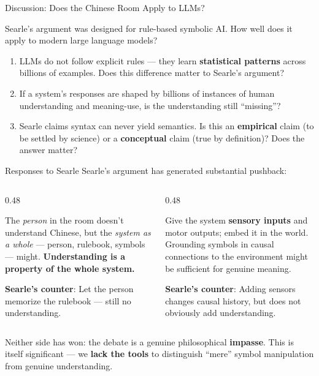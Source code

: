 \documentclass[aspectratio=169,11pt]{beamer}
\begin{document}
\begin{frame}{Discussion: Does the Chinese Room Apply to LLMs?}
\begin{discussionbox}[Discussion]
\small
Searle's argument was designed for rule-based symbolic AI. How well does it apply to modern large language models?
\begin{enumerate}
    \item LLMs do not follow explicit rules --- they learn \textbf{statistical patterns} across billions of examples. Does this difference matter to Searle's argument?
    \item If a system's responses are shaped by billions of instances of human understanding and meaning-use, is the understanding still ``missing''?
    \item Searle claims syntax can never yield semantics. Is this an \textbf{empirical} claim (to be settled by science) or a \textbf{conceptual} claim (true by definition)? Does the answer matter?
\end{enumerate}
\end{discussionbox}
\end{frame}

\begin{frame}[shrink=5]{Responses to Searle}
Searle's argument has generated substantial pushback:

\vspace{0.1cm}
\begin{columns}[T]
\begin{column}{0.48\textwidth}
\begin{probox}
\small
The \emph{person} in the room doesn't understand Chinese, but the \emph{system as a whole} --- person, rulebook, symbols --- might. \textbf{Understanding is a property of the whole system.}

\vspace{0.05cm}
\textbf{Searle's counter}: Let the person memorize the rulebook --- still no understanding.
\end{probox}
\end{column}
\begin{column}{0.48\textwidth}
\begin{probox}
\small
Give the system \textbf{sensory inputs} and motor outputs; embed it in the world. Grounding symbols in causal connections to the environment might be sufficient for genuine meaning.

\vspace{0.05cm}
\textbf{Searle's counter}: Adding sensors changes causal history, but does not obviously add understanding.
\end{probox}
\end{column}
\end{columns}

\vspace{0.2cm}
\begin{objectionbox}
\small
Neither side has won: the debate is a genuine philosophical \textbf{impasse}. This is itself significant --- we \textbf{lack the tools} to distinguish ``mere'' symbol manipulation from genuine understanding.
\end{objectionbox}
\end{frame}
\end{document}
